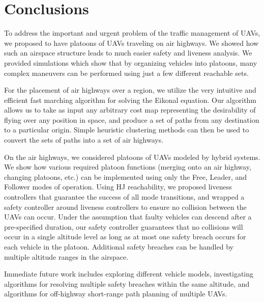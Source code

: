 \section{Conclusions}
To address the important and urgent problem of the traffic management of UAVs, we proposed to have platoons of UAVs traveling on air highways. We showed how such an airspace structure leads to much easier safety and liveness analysis. We provided simulations which show that by organizing vehicles into platoons, many complex maneuvers can be performed using just a few different reachable sets.

For the placement of air highways over a region, we utilize the very intuitive and efficient fast marching algorithm for solving the Eikonal equation. Our algorithm allows us to take as input any arbitrary cost map representing the desirability of flying over any position in space, and produce a set of paths from any destination to a particular origin. Simple heuristic clustering methods can then be used to convert the sets of paths into a set of air highways.

On the air highways, we considered platoons of UAVs modeled by hybrid systems. We show how various required platoon functions (merging onto an air highway, changing platoons, etc.) can be implemented using only the Free, Leader, and Follower modes of operation. Using HJ reachability, we proposed liveness controllers that guarantee the success of all mode transitions, and wrapped a safety controller around liveness controllers to ensure no collision between the UAVs can occur. Under the assumption that faulty vehicles can descend after a pre-specified duration, our safety controller guarantees that no collisions will occur in a single altitude level as long as at most one safety breach occurs for each vehicle in the platoon. Additional safety breaches can be handled by multiple altitude ranges in the airspace. 

Immediate future work includes exploring different vehicle models, investigating algorithms for resolving multiple safety breaches within the same altitude, and algorithms for off-highway short-range path planning of multiple UAVs.